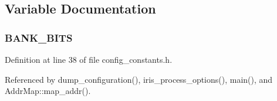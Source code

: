 \subsection{Variable Documentation}
\subsubsection[{BANK\_\-BITS}]{ {\bf BANK\_\-BITS}}\label{addr__map_8cc_40e7d425b08789ca96de0a1bc3af2803}




Definition at line 38 of file config\_\-constants.h.

Referenced by dump\_\-configuration(), iris\_\-process\_\-options(), main(), and AddrMap::map\_\-addr().